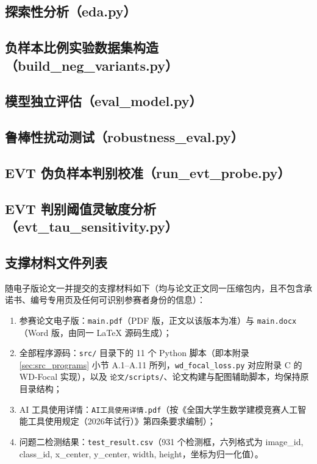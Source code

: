 \subsection{探索性分析（eda.py）}


\subsection{负样本比例实验数据集构造（build\_neg\_variants.py）}


\subsection{模型独立评估（eval\_model.py）}


\subsection{鲁棒性扰动测试（robustness\_eval.py）}


\subsection{EVT 伪负样本判别校准（run\_evt\_probe.py）}


\subsection{EVT 判别阈值灵敏度分析（evt\_tau\_sensitivity.py）}


\subsection{支撑材料文件列表}

随电子版论文一并提交的支撑材料如下（均与论文正文同一压缩包内，且不包含承诺书、编号专用页及任何可识别参赛者身份的信息）：
\begin{enumerate}
  \item 参赛论文电子版：\texttt{main.pdf}（PDF 版，正文以该版本为准）与 \texttt{main.docx}（Word 版，由同一 LaTeX 源码生成）；
  \item 全部程序源码：\texttt{src/} 目录下的 11 个 Python 脚本（即本附录 \ref{sec:src_programs} 小节 A.1--A.11 所列，\texttt{wd\_focal\_loss.py} 对应附录 C 的 WD-Focal 实现），以及 \texttt{论文/scripts/}、论文构建与配图辅助脚本，均保持原目录结构；
  \item AI 工具使用详情：\texttt{AI工具使用详情.pdf}（按《全国大学生数学建模竞赛人工智能工具使用规定（2026年试行）》第四条要求编制）；
  \item 问题二检测结果：\texttt{test\_result.csv}（931 个检测框，六列格式为 image\_id, class\_id, x\_center, y\_center, width, height，坐标为归一化值）。
\end{enumerate}

